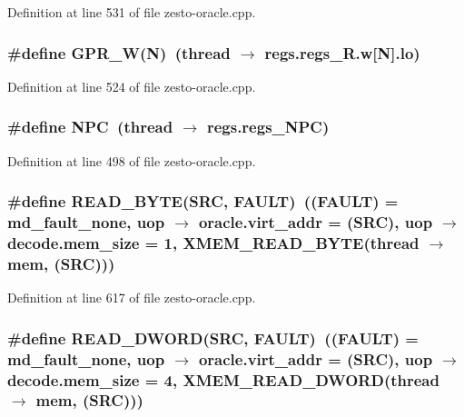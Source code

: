 Definition at line 531 of file zesto-oracle.cpp.
\subsubsection[{GPR\_\-W}]{\setlength{\rightskip}{0pt plus 5cm}\#define GPR\_\-W(N)~(thread $\rightarrow$ regs.regs\_\-R.w[N].lo)}\label{zesto-oracle_8cpp_49937247dbcf35e59ac3a4103e47259f}




Definition at line 524 of file zesto-oracle.cpp.
\subsubsection[{NPC}]{\setlength{\rightskip}{0pt plus 5cm}\#define NPC~(thread $\rightarrow$ regs.regs\_\-NPC)}\label{zesto-oracle_8cpp_6bc40f3f63777e2bd9deb13953e38b2d}




Definition at line 498 of file zesto-oracle.cpp.
\subsubsection[{READ\_\-BYTE}]{\setlength{\rightskip}{0pt plus 5cm}\#define READ\_\-BYTE(SRC, \/  FAULT)~((FAULT) = md\_\-fault\_\-none, uop $\rightarrow$ oracle.virt\_\-addr = (SRC), uop $\rightarrow$ decode.mem\_\-size = 1, XMEM\_\-READ\_\-BYTE(thread $\rightarrow$ mem, (SRC)))}\label{zesto-oracle_8cpp_2967bbef616af8861c316b12b5ca3203}




Definition at line 617 of file zesto-oracle.cpp.
\subsubsection[{READ\_\-DWORD}]{\setlength{\rightskip}{0pt plus 5cm}\#define READ\_\-DWORD(SRC, \/  FAULT)~((FAULT) = md\_\-fault\_\-none, uop $\rightarrow$ oracle.virt\_\-addr = (SRC), uop $\rightarrow$ decode.mem\_\-size = 4, XMEM\_\-READ\_\-DWORD(thread $\rightarrow$ mem, (SRC)))}\label{zesto-oracle_8cpp_a2ff7b45c340039544196f5da2de752b}




